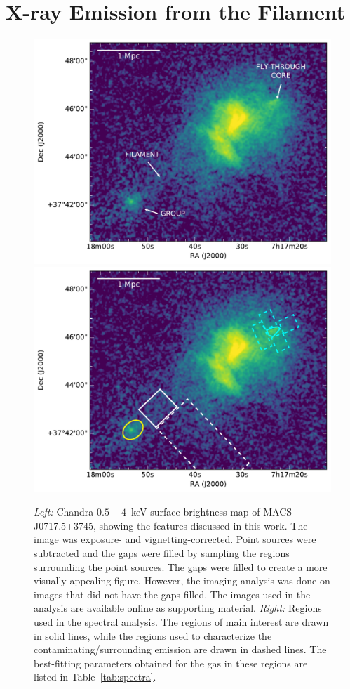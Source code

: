 \section{X-ray Emission from the Filament}
\label{sec:Filament}

\begin{figure}
    \includegraphics[width=\columnwidth]{plots/fil-labels.pdf}
    \includegraphics[width=\columnwidth]{plots/fil-regions.pdf}
    \caption{\emph{Left:} Chandra $0.5-4$~keV surface brightness map of MACS J0717.5+3745, showing the features discussed in this work. The image was exposure- and vignetting-corrected. Point sources were subtracted and the gaps were filled by sampling the regions surrounding the point sources. The gaps were filled to create a more visually appealing figure. However, the imaging analysis was done on images that did not have the gaps filled. The images used in the analysis are available online as supporting material. \emph{Right:} Regions used in the spectral analysis. The regions of main interest are drawn in solid lines, while the regions used to characterize the contaminating/surrounding emission are drawn in dashed lines. The best-fitting parameters obtained for the gas in these regions are listed in Table~\ref{tab:spectra}. \label{fig:fil}}
\end{figure}

